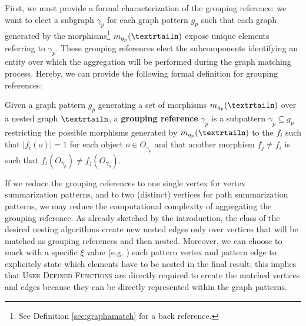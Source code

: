 First, we must provide a formal characterization of the grouping reference: we want to elect a subgraph $\gamma_p$ for each graph pattern $g_p$ such that each graph generated by the morphisms\footnote{See Definition \vref{sec:graphamatch} for a back reference.} $m_{g_p}(\nested)$ expose unique elements referring to $\gamma_p$. These grouping references elect the subcomponents identifying an entity over which the aggregation will be performed during the graph matching process. Hereby, we can provide the following formal definition for grouping references:
\begin{definition}
Given a graph pattern $g_p$ generating a set of morphisms $m_{g_p}(\nested)$ over a nested graph $\nested$, a \textbf{grouping reference} $\gamma_p$ is a subpattern $\gamma_p\subseteq g_p$ restricting the possible morphisms generated by $m_{g_p}(\nested)$ to the $f_i$ such that $|f_i(o)|=1$ for each object $o\in O_{\gamma_p}$ and that another morphism $f_j\neq f_i$ is such that $f_i(O_{\gamma_p})\neq f_j(O_{\gamma_p})$.
\end{definition}

If we reduce the grouping references to one single vertex for vertex summarization patterns, and to two (distinct) vertices for path summarization patterns, we may reduce the computational complexity of aggregating the grouping reference. As already sketched by the introduction, the class of the desired nesting algorithms create new nested edges only over vertices that will be  matched as grouping references and then nested. Moreover, we can choose to mark with a specific $\xi$ value (e.g. ) each pattern vertex and pattern edge to explicitely state which elements have to be nested in the final result; this implies that \textsc{User Defined Functions} are directly required to create the matched vertices and edges because they can be directly represented within the graph patterns.


